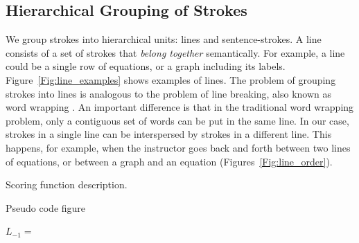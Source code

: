 \subsection{Hierarchical Grouping of Strokes}
We group strokes into hierarchical units: lines and sentence-strokes.  
A line consists of a set of strokes that \textit{belong together} semantically. For example, a line could be a single row of equations, or a graph including its labels. Figure~\ref{Fig:line_examples} shows examples of lines. The problem of grouping strokes into lines is analogous to the problem of line breaking, also known as word wrapping \cite{knuth1981breaking}. An important difference is that in the traditional word wrapping problem, only a contiguous set of words can be put in the same line. In our case, strokes in a single line can be interspersed by strokes in a different line. This happens, for example, when the instructor goes back and forth between two lines of equations, or between a graph and an equation (Figures~\ref{Fig:line_order}). 

Scoring function description.

Pseudo code figure
\begin{algorithm}[h]
\DontPrintSemicolon
\SetAlgoLined
\SetCommentSty{\small\ttfamily} 
  $L_{-1} =$ \string{\string} \;

\end{algorithm}

